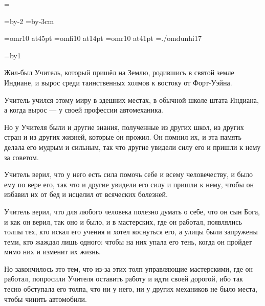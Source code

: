 
\shoutline=0pt
\shstaplewidth=0pt
\shcrop=0pt
\shthickness=0pt
\shfootline={}

\pdfpagewidth=297mm
\pdfpageheight=210mm
\pdfhorigin=-300pt
\pdfvorigin=1in
\shvoffset=-1in

\htotal=423pt
\vtotal=595pt
\horigin=1.5cm
\vorigin=1.5cm
\hsize=\htotal \advance\hsize by-2\horigin
\vsize=\vtotal \advance\vsize by-3cm

\font\chapfont=omr10 at45pt
\font\handfont=omfi10 at14pt
\font\bukvfont=omr10 at41pt
\font\bookfont=./omdunhi17

\def\pmb#1{\setbox0=\hbox{#1}%
  \leavevmode
  \kern-.025em\copy0\kern-\wd0
  \kern.05em\copy0\kern-\wd0
  \kern-.025em\raise.0433em\box0 }

\nopagenumbers

\baselineskip=17pt
\raggedbottom

{}
\vskip3cm

\newcount\n
\everypar={\advance\n by1 \hang}
\parskip=30pt
\raggedright
\handfont

Жил-был Учитель, который пришёл на Землю, родившись в святой земле Индиане, и вырос среди таинственных холмов к востоку от Форт-Уэйна.

Учитель учился этому миру в здешних местах, в обычной школе штата Индиана, а когда вырос --- у своей профессии автомеханика.

Но у Учителя были и другие знания, полученные из других школ, из других стран и из других жизней, которые он прожил. Он помнил их, и эта память делала его мудрым и сильным, так что другие увидели силу его и пришли к нему за советом.

Учитель верил, что у него есть сила помочь себе и всему человечеству, и было ему по вере его, так что и другие увидели его силу и пришли к нему, чтобы он избавил их от бед и исцелил от всяческих болезней.

Учитель верил, что для любого человека полезно думать о себе, что он сын Бога, и как он верил, так оно и было, и в мастерских, где он работал, появлялись толпы тех, кто искал его учения и хотел коснуться его, а улицы были запружены теми, кто жаждал лишь одного: чтобы на них упала его тень, когда он пройдет мимо них и изменит их жизнь.

Но закончилось это тем, что из-за этих толп управляющие мастерскими, где он работал, попросили Учителя оставить работу и идти своей дорогой, ибо так тесно обступала его толпа, что ни у него, ни у других механиков не было места, чтобы чинить автомобили.

